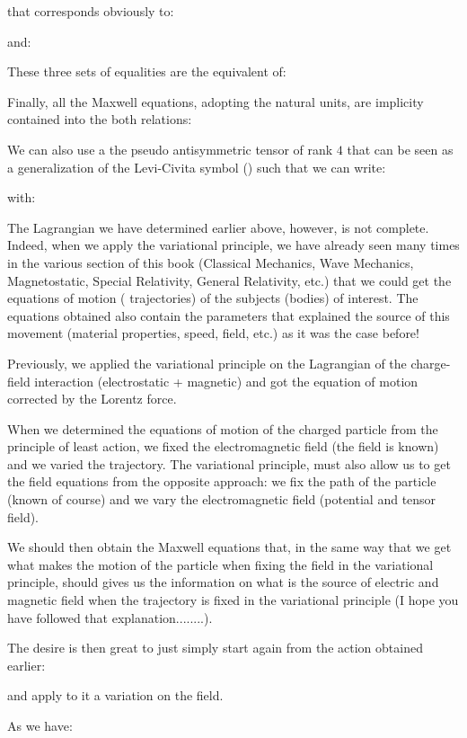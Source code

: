 	that corresponds obviously to:
	
	and:
	
	These three sets of equalities are the equivalent of:
	
	Finally, all the Maxwell equations, adopting the natural units, are implicity contained into the both relations:
	
	We can also use a the pseudo antisymmetric tensor of rank $4$ that can be seen as a generalization of the Levi-Civita symbol () such that we can write:
	
	with:
	
	The Lagrangian we have determined earlier above, however, is not complete. Indeed, when we apply the variational principle, we have already seen many times in the various section of this book (Classical Mechanics, Wave  Mechanics, Magnetostatic, Special Relativity, General Relativity, etc.) that we could get the equations of motion ( trajectories) of the subjects (bodies) of interest. The equations obtained also contain the parameters that explained the source of this movement (material properties, speed, field, etc.) as it was the case before!

	Previously, we applied the variational principle on the Lagrangian of the charge-field interaction (electrostatic + magnetic) and got the equation of motion corrected by the Lorentz force.

	When we determined the equations of motion of the charged particle from the principle of least action, we fixed the electromagnetic field (the field is known) and we varied the trajectory. The variational principle, must also allow us to get the field equations from the opposite approach: we fix the path of the particle (known of course) and we vary the electromagnetic field (potential and tensor field).

	We should then obtain the Maxwell equations that, in the same way that we get what makes the motion of the particle when fixing the field in the variational principle, should gives us the information on what is the source of electric and magnetic field when the trajectory is fixed in the variational principle (I hope you have followed that explanation........).

	The desire is then great to just simply start again from the action obtained earlier:
	
	and apply to it a variation on the field.

	As we have:
	
